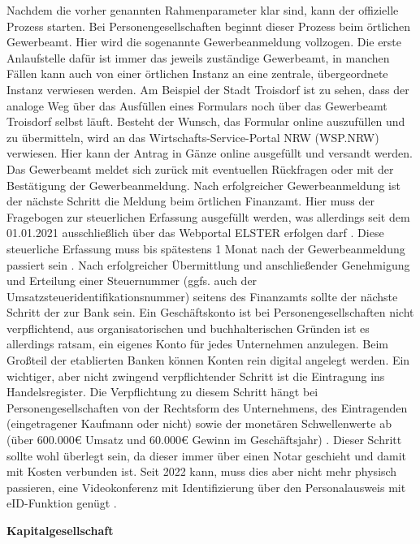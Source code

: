 Nachdem die vorher genannten Rahmenparameter klar sind, kann der offizielle Prozess starten. Bei Personengesellschaften beginnt dieser Prozess beim örtlichen Gewerbeamt. Hier wird die sogenannte Gewerbeanmeldung vollzogen. Die erste Anlaufstelle dafür ist immer das jeweils zuständige Gewerbeamt, in manchen Fällen kann auch von einer örtlichen Instanz an eine zentrale, übergeordnete Instanz verwiesen werden. Am Beispiel der Stadt Troisdorf ist zu sehen, dass der analoge Weg über das Ausfüllen eines Formulars noch über das Gewerbeamt Troisdorf selbst läuft. Besteht der Wunsch, das Formular online auszufüllen und zu übermitteln, wird an das Wirtschafts-Service-Portal NRW (WSP.NRW) verwiesen. Hier kann der Antrag in Gänze online ausgefüllt und versandt werden. Das Gewerbeamt meldet sich zurück mit eventuellen Rückfragen oder mit der Bestätigung der Gewerbeanmeldung. Nach erfolgreicher Gewerbeanmeldung ist der nächste Schritt die Meldung beim örtlichen Finanzamt. Hier muss der Fragebogen zur steuerlichen Erfassung ausgefüllt werden, was allerdings seit dem 01.01.2021 ausschließlich über das Webportal ELSTER erfolgen darf . Diese steuerliche Erfassung muss bis spätestens 1 Monat nach der Gewerbeanmeldung passiert sein . Nach erfolgreicher Übermittlung und anschließender Genehmigung und Erteilung einer Steuernummer (ggfs. auch der Umsatzsteueridentifikationsnummer) seitens des Finanzamts sollte der nächste Schritt der zur Bank sein. Ein Geschäftskonto ist bei Personengesellschaften nicht verpflichtend, aus organisatorischen und buchhalterischen Gründen ist es allerdings ratsam, ein eigenes Konto für jedes Unternehmen anzulegen. Beim Großteil der etablierten Banken können Konten rein digital angelegt werden. Ein wichtiger, aber nicht zwingend verpflichtender Schritt ist die Eintragung ins Handelsregister. Die Verpflichtung zu diesem Schritt hängt bei Personengesellschaften von der Rechtsform des Unternehmens, des Eintragenden (eingetragener Kaufmann oder nicht) sowie der monetären Schwellenwerte ab (über 600.000€ Umsatz und 60.000€ Gewinn im Geschäftsjahr) . Dieser Schritt sollte wohl überlegt sein, da dieser immer über einen Notar geschieht und damit mit Kosten verbunden ist. Seit 2022 kann, muss dies aber nicht mehr physisch passieren, eine Videokonferenz mit Identifizierung über den Personalausweis mit eID-Funktion genügt . 

\textbf{Kapitalgesellschaft}

